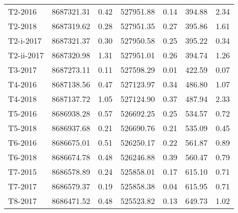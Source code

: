 \begin{tabular}{lrrrrrr}
     T2-2016 &    8687321.31 &                0.42 &    527951.88 &               0.14 &         394.88 &                 2.34 \\
     T2-2018 &    8687319.62 &                0.28 &    527951.35 &               0.27 &         395.86 &                 1.61 \\
   T2-i-2017 &    8687321.37 &                0.30 &    527950.58 &               0.25 &         395.22 &                 0.34 \\
  T2-ii-2017 &    8687320.98 &                1.31 &    527951.01 &               0.26 &         394.74 &                 1.26 \\
     T3-2017 &    8687273.11 &                0.11 &    527598.29 &               0.01 &         422.59 &                 0.07 \\
     T4-2016 &    8687138.56 &                0.47 &    527123.97 &               0.34 &         486.80 &                 1.07 \\
     T4-2018 &    8687137.72 &                1.05 &    527124.90 &               0.37 &         487.94 &                 2.33 \\
     T5-2016 &    8686938.28 &                0.57 &    526692.25 &               0.25 &         534.57 &                 0.72 \\
     T5-2018 &    8686937.68 &                0.21 &    526690.76 &               0.21 &         535.09 &                 0.45 \\
     T6-2016 &    8686675.01 &                0.51 &    526250.17 &               0.22 &         561.87 &                 0.89 \\
     T6-2018 &    8686674.78 &                0.48 &    526246.88 &               0.39 &         560.47 &                 0.79 \\
     T7-2015 &    8686578.89 &                0.24 &    525858.01 &               0.17 &         615.10 &                 0.71 \\
     T7-2017 &    8686579.37 &                0.19 &    525858.38 &               0.04 &         615.95 &                 0.71 \\
     T8-2017 &    8686471.52 &                0.48 &    525523.82 &               0.13 &         649.73 &                 1.02 \\
\bottomrule
\end{tabular}
